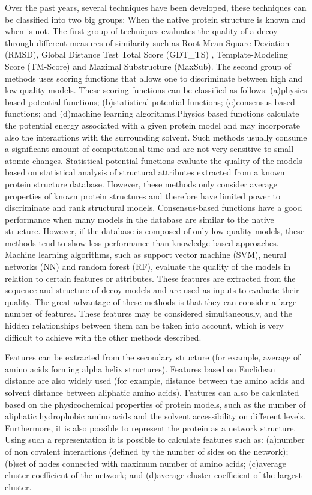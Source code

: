 Over the past years, several techniques have been developed, these techniques can be classified into two big groups: When the  native protein structure is known and when is not. The first group of techniques evaluates the quality of a decoy through different measures of similarity such as Root-Mean-Square Deviation (RMSD)\cite{26}, Global Distance Test Total Score (GDT\_TS) \cite{27}, Template-Modeling Score (TM-Score)\cite{28} and Maximal Substructure (MaxSub)\cite{29}. The second group of methods uses scoring functions that allows one to discriminate between high and low-quality models. These scoring functions can be classified as follows: (a)physics based potential functions; (b)statistical potential functions; (c)consensus-based functions; and (d)machine learning algorithms.Physics based functions calculate the potential energy associated with a given protein model and may incorporate also the interactions with the surrounding solvent\cite{30}\cite{31}. Such methods usually consume a significant amount of computational time and are not very sensitive to small atomic changes. Statistical potential functions evaluate the quality of the  models based on statistical analysis of structural attributes extracted from a known protein structure database\cite{32}\cite{33}. However, these methods only consider average properties of known protein structures and therefore have limited power to discriminate and rank structural models. Consensus-based functions have a good performance when many models in the database are similar to the native structure. However, if the database is composed of only low-quality models, these methods tend to show less performance than knowledge-based approaches\cite{34}\cite{35}. Machine learning algorithms, such as support vector machine (SVM), neural networks (NN) and random forest (RF), evaluate the quality of the models in relation to certain features or attributes\cite{36}\cite{37}. These features are extracted from the sequence and structure of decoy models and are used as inputs to evaluate their quality. The great advantage of these methods is that they can consider a large number of features. These features may be considered simultaneously, and the hidden relationships between them can be taken into account, which is very difficult to achieve with the other methods described.

Features can be extracted from the secondary structure (for example, average of amino acids forming alpha helix structures). Features based on Euclidean distance are also widely used (for example, distance between the amino acids and solvent distance between aliphatic amino acids). Features can also be calculated based on the physicochemical properties of protein models, such as the number of aliphatic hydrophobic amino acids and the solvent accessibility on different levels\cite{38}\cite{39}\cite{40}. Furthermore, it is also possible to represent the protein as a network structure\cite{41}. Using such a representation it is possible to calculate features such as: (a)number of non covalent interactions (defined by the number of sides on the network); (b)set of nodes connected with maximum number of amino acids; (c)average cluster coefficient of the network; and (d)average cluster coefficient of the largest cluster. 

